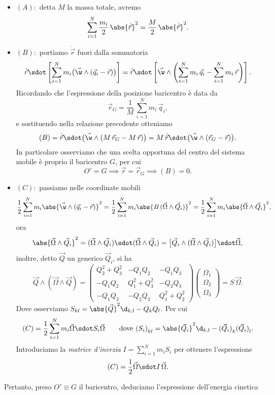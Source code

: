 \begin{itemize}
	\item \((A):\) detta \(M\) la massa totale, avremo
	      \[
		      \sum_{i=1}^N \frac{m_i}{2}\,\abs{\dot{\vec{r}}}^2 = \frac{M}{2}\,\abs{\dot{\vec{r}}}^2.
	      \]
	\item \((B):\) portiamo \(\dot{\vec{r}}\) fuori dalla sommatoria
	      \[
		      \dot{\vec{r}} \sdot \left[\sum_{i=1}^N m_i\big(\vec{\w}\wedge(\vec{q}_i-\vec{r})\big)\right] = \dot{\vec{r}} \sdot \left[\vec{\w} \wedge \left(\sum_{i=1}^N m_i\,\vec{q}_i-\sum_{i=1}^N m_i\,\vec{r}\right)\right].
	      \]
	      Ricordando che l'espressione della posizione baricentro è data da
	      \[
		      \vec{r}_G = \frac{1}{M}\,\sum_{i=1}^N m_i\,\vec{q}_i,
	      \]
	      e sostituendo nella relazione precedente otteniamo
	      \[
		      (B) = \dot{\vec{r}} \sdot \big(\vec{\w}\wedge(M\,\vec{r}_G-M\,\vec{r})\big) = M\,\dot{\vec{r}} \sdot \big(\vec{\w}\wedge(\vec{r}_G-\vec{r})\big).
	      \]
	      In particolare osserviamo che una scelta opportuna del centro del sistema mobile è proprio il baricentro \(G\), per cui
	      \[
		      O'=G \implies \vec{r}=\vec{r}_G \implies (B) = 0.
	      \]
	\item \((C):\) passiamo nelle coordinate mobili
	      \[
		      \frac{1}{2}\sum_{i=1}^N m_i \abs{\vec{\w}\wedge(\vec{q}_i-\vec{r})}^2 = \frac{1}{2}\sum_{i=1}^N m_i \abs{B\,(\vec{\Omega}\wedge\vec{Q}_i)}^2 = \frac{1}{2}\sum_{i=1}^N m_i \abs{\vec{\Omega}\wedge\vec{Q}_i}^2,
	      \]
	      ora
	      \[
		      \abs{\vec{\Omega}\wedge\vec{Q}_i}^2 = (\vec{\Omega}\wedge\vec{Q}_i) \sdot (\vec{\Omega}\wedge\vec{Q}_i) = \big[\vec{Q}_i\wedge(\vec{\Omega}\wedge\vec{Q}_i)\big] \sdot \vec{\Omega},
	      \]
	      inoltre, detto \(\vec{Q}\) un generico \(\vec{Q}_i\), si ha
	      \[
		      \vec{Q} \wedge (\vec{\Omega}\wedge\vec{Q}) = 	\begin{pmatrix}
			      Q_2^2+Q_3^2 & -Q_1 Q_2    & -Q_1 Q_3      \\
			      -Q_1 Q_2    & Q_1^2+Q_3^2 & -Q_2 Q_3      \\
			      -Q_1 Q_3    & -Q_2 Q_3    & Q_1^2 +Q_2^2
		      \end{pmatrix}
		      \begin{pmatrix}\Omega_1\\\Omega_2\\\Omega_3\end{pmatrix} =
		      S\,\vec{\Omega}.
	      \]
	      Dove osserviamo \(S_{k l} = \abs{\vec{Q}}^2 \d_{k,l} - Q_k Q_l\). Per cui
	      \[
		      (C) = \frac{1}{2}\sum_{i=1}^N m_i \vec{\Omega} \sdot S_i \vec{\Omega} \qquad\text{dove }{(S_i)}_{k l} = \abs{\vec{Q}_i}^2 \d_{k,l} - {(\vec{Q}_i)}_k {(\vec{Q}_i)}_l.
	      \]
	      Introduciamo la \emph{matrice d'inerzia} \(I=\sum_{i=1}^N m_i S_i\) per ottenere l'espressione
	      \[
		      (C) = \frac{1}{2} \vec{\Omega} \sdot I\,\vec{\Omega}.
	      \]
\end{itemize}
\noindent
Pertanto, preso \(O'\equiv G\) il baricentro, deduciamo l'espressione dell'energia cinetica

